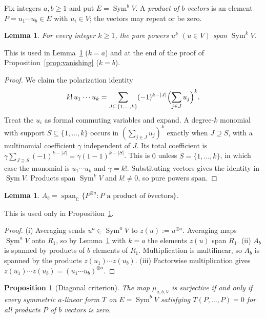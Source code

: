 \documentclass[11pt]{article}
\newtheorem{proposition}[theorem]{Proposition}
\newtheorem{lemma}[theorem]{Lemma}
\theoremstyle{remark}
\DeclareMathOperator{\Sym}{Sym}
\newcommand{\C}{\mathbb C}
\begin{document}
Fix integers $a,b\ge1$ and put $E=\Sym^bV$. A \emph{product of $b$ vectors}
is an element $P=u_1\cdots u_b\in E$ with $u_i\in V$; the vectors may repeat
or be zero.

\begin{lemma}\label{lem:powers}
For every integer $k\ge1$, the pure powers $u^k$ $(u\in V)$ span $\Sym^kV$.
\end{lemma}

This is used in Lemma~\ref{lem:image} ($k=a$) and at the end of the proof of
Proposition~\ref{prop:vanishing} ($k=b$).

\begin{proof}
We claim the polarization identity
\[
 k!\,u_1\cdots u_k
 =\sum_{J\subseteq\{1,\ldots,k\}}(-1)^{k-|J|}
   \Bigl(\sum_{j\in J}u_j\Bigr)^k .
\]
Treat the $u_i$ as formal commuting variables and expand. A degree-$k$
monomial with support $S\subseteq\{1,\ldots,k\}$ occurs in
$(\sum_{j\in J}u_j)^k$ exactly when $J\supseteq S$, with a multinomial
coefficient $\gamma$ independent of $J$. Its total coefficient is
$\gamma\sum_{J\supseteq S}(-1)^{k-|J|}=\gamma(1-1)^{k-|S|}$. This is $0$
unless $S=\{1,\ldots,k\}$, in which case the monomial is $u_1\cdots u_k$ and
$\gamma=k!$. Substituting vectors gives the identity in $\Sym V$. Products
span $\Sym^kV$ and $k!\ne0$, so pure powers span.
\end{proof}

\begin{lemma}\label{lem:image}
$A_b=\operatorname{span}_{\C}\{P^{\otimes a}:P\text{ a product of }b\text{
vectors}\}$.
\end{lemma}

This is used only in Proposition~\ref{prop:criterion}.

\begin{proof}
(i) Averaging sends $u^a\in\Sym^aV$ to $z(u):=u^{\otimes a}$. Averaging maps
$\Sym^aV$ onto $R_1$, so by Lemma~\ref{lem:powers} with $k=a$ the elements
$z(u)$ span $R_1$.
(ii) $A_b$ is spanned by products of $b$ elements of $R_1$. Multiplication is
multilinear, so $A_b$ is spanned by the products $z(u_1)\cdots z(u_b)$.
(iii) Factorwise multiplication gives
$z(u_1)\cdots z(u_b)=(u_1\cdots u_b)^{\otimes a}$.
\end{proof}

\begin{proposition}[Diagonal criterion]\label{prop:criterion}
The map $\mu_{a,b,V}$ is surjective if and only if every symmetric $a$-linear
form $T$ on $E=\Sym^bV$ satisfying $T(P,\ldots,P)=0$ for all products $P$ of
$b$ vectors is zero.
\end{proposition}
\end{document}
